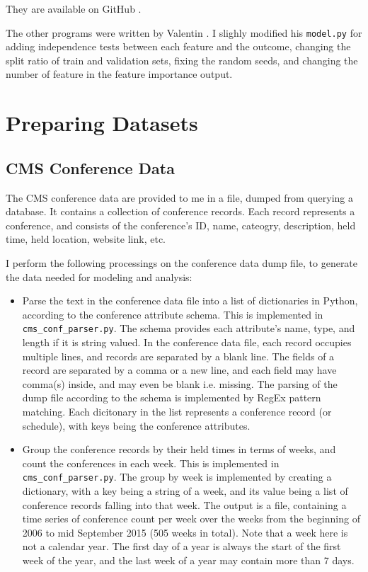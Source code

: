 \documentclass[final, 12pt]{elsarticle}
\begin{document}
They are available on GitHub \cite{web:tlgithub}. %

The other programs were written by Valentin \cite{web:vkgithub}. I slighly modified his \verb|model.py| for  adding independence tests between each feature and the outcome, changing the split ratio of train and validation sets, fixing the random seeds, and changing the number of feature in the feature importance output.

\section{Preparing Datasets}
\label{S:2}

\subsection{CMS Conference Data}


The CMS conference data are provided to me in a file, dumped from querying a database.
It contains a collection of conference records.
Each record represents a conference, and consists of the conference's ID, name, cateogry, description, held time, held location, website link, etc.

I perform the following processings on the conference data dump file, to generate the data needed for modeling and analysis:

\begin{itemize}
  
\item Parse the text in the conference data file into a list of dictionaries in Python, according to the conference attribute schema.
This is implemented in \verb|cms_conf_parser.py|.
The schema provides each attribute's name, type, and length if it is string valued.
In the conference data file, each record occupies multiple lines, and records are separated by a blank line. The fields of a record are separated by a comma or a new line, and each field may have comma(s) inside, and may even be blank i.e. missing.
The parsing of the dump file according to the schema is implemented by RegEx pattern matching.
Each dicitonary in the list represents a conference record (or schedule), with keys being the conference attributes.

\item Group the conference records by their held times in terms of weeks, and count the conferences in each week.
This is implemented in \verb|cms_conf_parser.py|.
The group by week is implemented by creating a dictionary, with a key being a string of a week, and its value being a list of conference records falling into that week.
The output is a file, containing a time series of conference count per week over the weeks from the beginning of 2006 to mid September 2015 (505 weeks in total).
Note that a week here is not a calendar year. The first day of a year is always the start of the first week of the year, and the last week of a year may contain more than 7 days.

\end{itemize}
\end{document}
